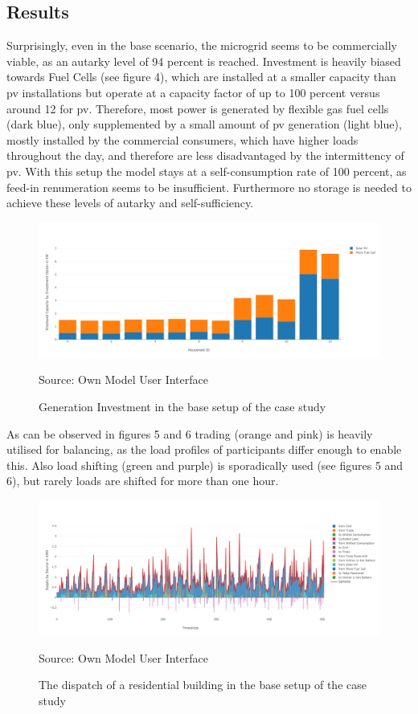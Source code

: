 \documentclass[
	11pt,								%
	DIV10,								%
	a4paper,         					%
	oneside,							%
	headheight=20pt,					%
	footheight=20pt,					%
    parskip=full,						%
    listof=totoc,						%
	bibliography=totoc,					%
	index=totoc,						%
]{scrartcl}
\begin{document}
\subsection{Results}
Surprisingly, even in the base scenario, the microgrid seems to be commercially viable, as an autarky level of 94 percent is reached. Investment is heavily biased towards Fuel Cells (see figure 4), which are installed at a smaller capacity than pv installations but operate at a capacity factor of up to 100 percent versus around 12 for pv. Therefore, most power is generated by flexible gas fuel cells (dark blue), only supplemented by a small amount of pv generation (light blue), mostly installed by the commercial consumers, which have higher loads throughout the day, and therefore are less disadvantaged by the intermittency of pv. With this setup the model stays at a self-consumption rate of 100 percent, as feed-in renumeration seems to be insufficient. Furthermore no storage is needed to achieve these levels of autarky and self-sufficiency. 
\begin{figure}[H]
	\centering
	\includegraphics[width=1\textwidth]{pictures/INV_GEN_Base.png}
	\caption{Generation Investment in the base setup of the case study}
	\label{gen_investment_base}
	\flushleft\quad\quad\footnotesize{Source: Own Model User Interface}
\end{figure}

As can be observed in figures 5 and 6 trading (orange and pink) is heavily utilised for balancing, as the load profiles of participants differ enough to enable this. Also load shifting (green and purple) is sporadically used (see figures 5 and 6), but rarely loads are shifted for more than one hour.

\begin{figure}[H]
	\centering
	\includegraphics[width=1\textwidth]{pictures/RES_1_Base.png}
	\caption{The dispatch of a residential building in the base setup of the case study}
	\label{residential_dispatch_base}
	\flushleft\quad\quad\footnotesize{Source: Own Model User Interface}
\end{figure}	
\end{document}
